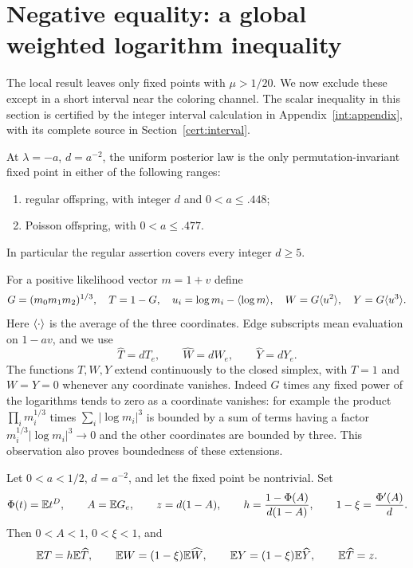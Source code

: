 \section{Negative equality: a global weighted logarithm inequality}
\label{sec:weighted}
The local result leaves only fixed points with $\mu>1/20$.
We now exclude these except in a short interval near the coloring
channel.  The scalar inequality in this section is certified by the
integer interval calculation in Appendix~\ref{int:appendix}, with its
complete source in Section~\ref{cert:interval}.

\begin{proposition}
\label{wei:theorem}\label{wei:exclusion}
At $\lambda=-a$, $d=a^{-2}$, the uniform posterior law is the only
permutation-invariant fixed point in either of the following ranges:
\begin{enumerate}
 \item regular offspring, with integer $d$ and $0<a\le.448$;
 \item Poisson offspring, with $0<a\le.477$.
\end{enumerate}
In particular the regular assertion covers every integer $d\ge5$.
\end{proposition}

For a positive likelihood vector $m=1+v$ define
\begin{equation}\label{wei:functions}
 G=(m_0m_1m_2)^{1/3},\quad T=1-G,\quad
 u_i=\log m_i-\langle \log m\rangle,\quad
 W=G\langle u^2\rangle,\quad Y=G\langle u^3\rangle.
\end{equation}
Here $\langle \cdot\rangle$ is the average of the three coordinates.  Edge
subscripts mean evaluation on $1-av$, and we use
\[
 \widehat T=dT_e,\qquad\widehat W=dW_e,\qquad\widehat Y=dY_e.
\]
The functions $T,W,Y$ extend continuously to the closed simplex, with
$T=1$ and $W=Y=0$ whenever any coordinate vanishes.  Indeed
$G$ times any fixed power of the logarithms tends to zero as a coordinate
vanishes: for example the product $\prod_i m_i^{1/3}$ times
$\sum_i|\log m_i|^3$ is bounded by a sum of terms having a factor
$m_i^{1/3}|\log m_i|^3\to0$ and the other coordinates are bounded by
three.  This observation also proves boundedness of these extensions.

\begin{lemma}\label{wei:identities}
Let $0<a<1/2$, $d=a^{-2}$, and let the fixed point be nontrivial.
Set
\begin{equation}\label{wei:scalars}
 \Phi(t)=\mathbb E t^{D},\qquad A=\mathbb E G_e,\qquad
 z=d(1-A),\qquad h=\frac{1-\Phi(A)}{d(1-A)},\qquad
 1-\xi=\frac{\Phi'(A)}d.
\end{equation}
Then $0<A<1$, $0<\xi<1$, and
\begin{equation}\label{wei:exact}
 \mathbb E T=h\mathbb E\widehat T,\qquad
 \mathbb E W=(1-\xi)\mathbb E\widehat W,\qquad
 \mathbb E Y=(1-\xi)\mathbb E\widehat Y,\qquad
 \mathbb E\widehat T=z.
\end{equation}
\end{lemma}

